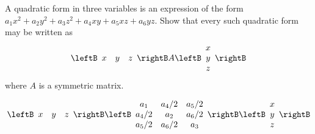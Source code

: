 \begin{enumialphparenastyle}

\begin{ex} \label{quadraticform1} A quadratic form in three variables is an expression of
the form $a_{1}x^{2}+a_{2}y^{2}+a_{3}z^{2}+a_{4}xy+a_{5}xz+a_{6}yz.$ Show
that every such quadratic form may be written as 
\begin{equation*}
\leftB
\begin{array}{ccc}
x & y & z
\end{array}
\rightB A \leftB 
\begin{array}{c}
x \\ 
y \\ 
z
\end{array}
\rightB
\end{equation*}
where $A$ is a symmetric matrix.
\begin{sol}
\[
\leftB
\begin{array}{ccc}
x & y & z
\end{array}
\rightB \leftB
\begin{array}{ccc}
a_{1} & a_{4}/2 & a_{5}/2 \\
a_{4}/2 & a_{2} & a_{6}/2 \\
a_{5}/2 & a_{6}/2 & a_{3}
\end{array}
\rightB \leftB
\begin{array}{c}
x \\
y \\
z
\end{array}
\rightB
\]
\end{sol}
\end{ex}



\end{enumialphparenastyle}
